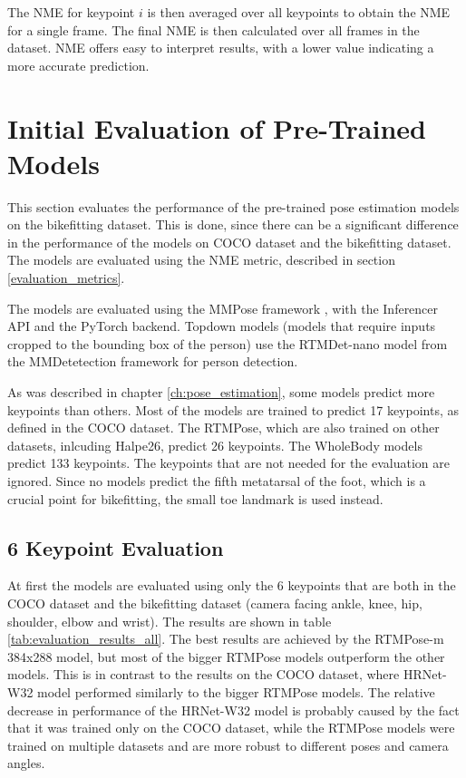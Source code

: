 The NME for keypoint $i$ is then averaged over all keypoints to obtain the NME for a single frame. The final NME is then calculated over all frames in the dataset. NME offers easy to interpret results, with a lower value indicating a more accurate prediction.

\section{Initial Evaluation of Pre-Trained Models}
\label{initial_evaluation}
This section evaluates the performance of the pre-trained pose estimation models on the bikefitting dataset. This is done, since there can be a significant difference in the performance of the models on COCO dataset and the bikefitting dataset. The models are evaluated using the NME metric, described in section \ref{evaluation_metrics}.

The models are evaluated using the MMPose framework \cite{mmpose2020}, with the Inferencer API and the PyTorch backend. Topdown models (models that require inputs cropped to the bounding box of the person) use the RTMDet-nano model \cite{rtmdet} from the MMDetetection framework \cite{mmdetection} for person detection.

As was described in chapter \ref{ch:pose_estimation}, some models predict more keypoints than others. Most of the models are trained to predict 17 keypoints, as defined in the COCO dataset. The RTMPose, which are also trained on other datasets, inlcuding Halpe26, predict 26 keypoints. The WholeBody models predict 133 keypoints. The keypoints that are not needed for the evaluation are ignored. Since no models predict the fifth metatarsal of the foot, which is a crucial point for bikefitting, the small toe landmark is used instead.

\subsection{6 Keypoint Evaluation}

At first the models are evaluated using only the 6 keypoints that are both in the COCO dataset and the bikefitting dataset (camera facing ankle, knee, hip, shoulder, elbow and wrist). The results are shown in table \ref{tab:evaluation_results_all}. The best results are achieved by the RTMPose-m 384x288 model, but most of the bigger RTMPose models outperform the other models. This is in contrast to the results on the COCO dataset, where HRNet-W32 model performed similarly to the bigger RTMPose models. The relative decrease in performance of the HRNet-W32 model is probably caused by the fact that it was trained only on the COCO dataset, while the RTMPose models were trained on multiple datasets and are more robust to different poses and camera angles.




